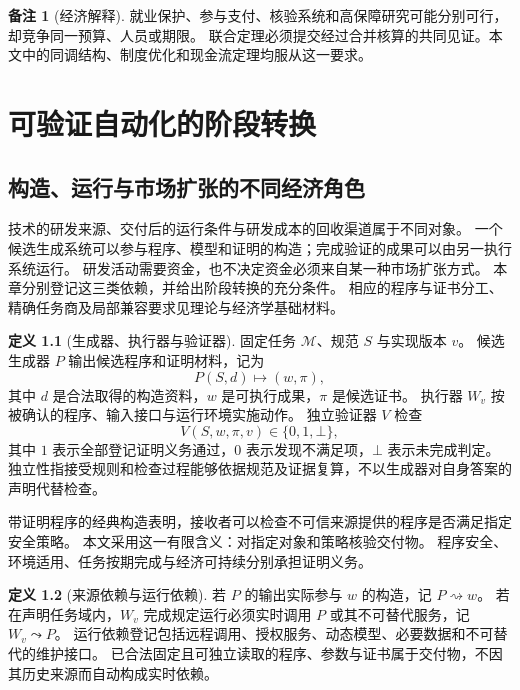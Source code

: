 \documentclass[UTF8,12pt,a4paper,openany,fontset=none,zihao=false]{ctexrep}
\theoremstyle{definition}
\newtheorem{definition}{定义}[chapter]
\newtheorem{remark}{备注}[chapter]
\newcommand{\1}{\mathbf 1}
\begin{document}
\begin{remark}[经济解释]
就业保护、参与支付、核验系统和高保障研究可能分别可行，却竞争同一预算、人员或期限。
联合定理必须提交经过合并核算的共同见证。本文中的同调结构、制度优化和现金流定理均服从这一要求。
\end{remark}

\chapter{可验证自动化的阶段转换}
\label{tra:chapter}

\section{构造、运行与市场扩张的不同经济角色}

技术的研发来源、交付后的运行条件与研发成本的回收渠道属于不同对象。
一个候选生成系统可以参与程序、模型和证明的构造；完成验证的成果可以由另一执行系统运行。
研发活动需要资金，也不决定资金必须来自某一种市场扩张方式。
本章分别登记这三类依赖，并给出阶段转换的充分条件。
相应的程序与证书分工、精确任务商及局部兼容要求见理论与经济学基础材料\cite{Necula1997,InternalTheory,InternalEconomics}。

\begin{definition}[生成器、执行器与验证器]
\label{tra:pwv}
固定任务 \(\mathcal M\)、规范 \(S\) 与实现版本 \(v\)。
候选生成器 \(P\) 输出候选程序和证明材料，记为
\[
P(S,d)\longmapsto (w,\pi),
\]
其中 \(d\) 是合法取得的构造资料，\(w\) 是可执行成果，\(\pi\) 是候选证书。
执行器 \(W_v\) 按被确认的程序、输入接口与运行环境实施动作。
独立验证器 \(V\) 检查
\[
V(S,w,\pi,v)\in\{0,1,\bot\},
\]
其中 \(1\) 表示全部登记证明义务通过，\(0\) 表示发现不满足项，\(\bot\) 表示未完成判定。
独立性指接受规则和检查过程能够依据规范及证据复算，不以生成器对自身答案的声明代替检查。
\end{definition}

带证明程序的经典构造表明，接收者可以检查不可信来源提供的程序是否满足指定安全策略\cite{Necula1997}。
本文采用这一有限含义：对指定对象和策略核验交付物。
程序安全、环境适用、任务按期完成与经济可持续分别承担证明义务。

\begin{definition}[来源依赖与运行依赖]
若 \(P\) 的输出实际参与 \(w\) 的构造，记 \(P\rightsquigarrow w\)。
若在声明任务域内，\(W_v\) 完成规定运行必须实时调用 \(P\) 或其不可替代服务，记 \(W_v\leadsto P\)。
运行依赖登记包括远程调用、授权服务、动态模型、必要数据和不可替代的维护接口。
已合法固定且可独立读取的程序、参数与证书属于交付物，不因其历史来源而自动构成实时依赖。
\end{definition}
\end{document}
